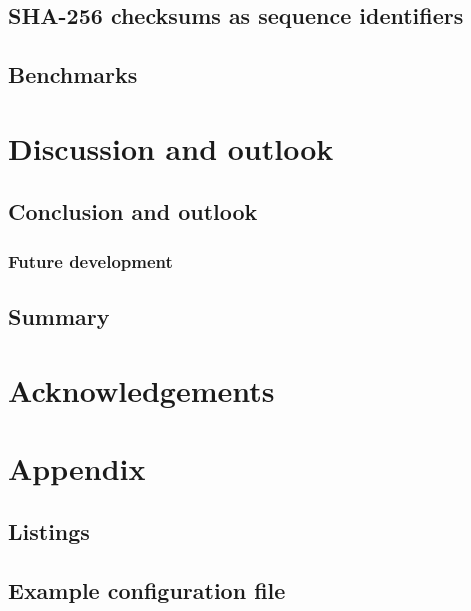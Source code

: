 \documentclass[a4paper,12pt]{scrreprt}
\begin{document}
	\section{SHA-256 checksums as sequence identifiers}
		
	\section{Benchmarks}

\chapter{Discussion and outlook}
	
	\section{Conclusion and outlook}
		\subsection{Future development}
		
	\section{Summary}

{}
\chapter*{Acknowledgements}
	
	\clearpage

{}
\footnotesize


\normalsize
\clearpage

\appendix
\chapter{Appendix}
	\section{Listings}
		
	\section{Example configuration file}
		
\end{document}
